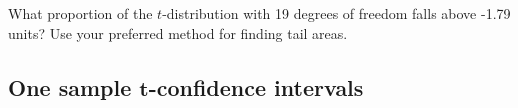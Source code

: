 \begin{exercisewrap}
\begin{nexercise}
What proportion of the $t$-distribution with 19 degrees
of freedom falls above -1.79 units?
Use your preferred method for finding tail areas.\footnotemark{}
\end{nexercise}
\end{exercisewrap}



%
%
%


\D{\newpage}

\subsection[One sample $t$-confidence intervals]
    {One sample $\pmb{t}$-confidence intervals}
\label{oneSampleTConfidenceIntervals}


